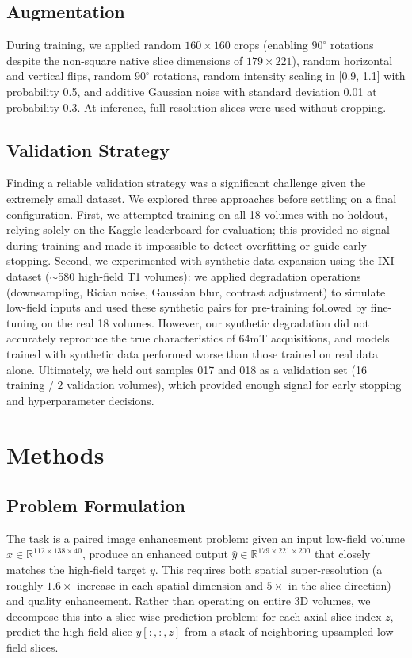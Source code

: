 \documentclass[a4paper,11pt]{article}
\begin{document}
\subsection{Augmentation}
During training, we applied random $160 \times 160$ crops (enabling $90^\circ$ rotations despite the non-square native slice dimensions of $179 \times 221$), random horizontal and vertical flips, random $90^\circ$ rotations, random intensity scaling in [0.9, 1.1] with probability 0.5, and additive Gaussian noise with standard deviation 0.01 at probability 0.3. At inference, full-resolution slices were used without cropping.

\subsection{Validation Strategy}
Finding a reliable validation strategy was a significant challenge given the extremely small dataset. We explored three approaches before settling on a final configuration. First, we attempted training on all 18 volumes with no holdout, relying solely on the Kaggle leaderboard for evaluation; this provided no signal during training and made it impossible to detect overfitting or guide early stopping. Second, we experimented with synthetic data expansion using the IXI dataset ($\sim$580 high-field T1 volumes): we applied degradation operations (downsampling, Rician noise, Gaussian blur, contrast adjustment) to simulate low-field inputs and used these synthetic pairs for pre-training followed by fine-tuning on the real 18 volumes. However, our synthetic degradation did not accurately reproduce the true characteristics of 64mT acquisitions, and models trained with synthetic data performed worse than those trained on real data alone. Ultimately, we held out samples 017 and 018 as a validation set (16 training / 2 validation volumes), which provided enough signal for early stopping and hyperparameter decisions.

\section{Methods}

\subsection{Problem Formulation}
The task is a paired image enhancement problem: given an input low-field volume $x \in \mathbb{R}^{112 \times 138 \times 40}$, produce an enhanced output $\hat{y} \in \mathbb{R}^{179 \times 221 \times 200}$ that closely matches the high-field target $y$. This requires both spatial super-resolution (a roughly $1.6\times$ increase in each spatial dimension and $5\times$ in the slice direction) and quality enhancement. Rather than operating on entire 3D volumes, we decompose this into a slice-wise prediction problem: for each axial slice index $z$, predict the high-field slice $y[:,:,z]$ from a stack of neighboring upsampled low-field slices.
\end{document}
